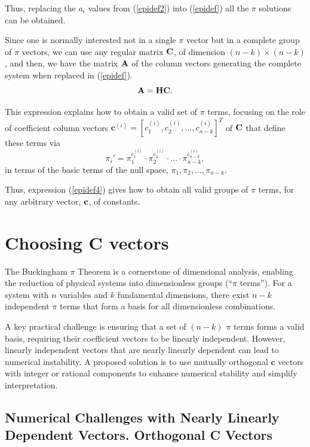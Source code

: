 \documentclass[
	11pt, %
	fleqn, %
	a4paper, %
]{LegrandOrangeBook}
\begin{document}
Thus, replacing the $a_i$ values from (\ref{epidef2}) into (\ref{epidef}) all the $\pi$ solutions can be obtained.

Since one is normally interested not in a single $\pi$ vector but in a complete group of $\pi$ vectors, we can use any regular matrix ${\bf C}$, of dimension $(n-k) \times (n-k)$, and then, we have the matrix ${\bf A}$ of the column vectors generating the complete system when replaced in (\ref{epidef}).
\begin{equation}\label{epidef3}
   {\bf A} =  {\bf H} {\bf C}.
\end{equation}

This expression explains how to obtain a valid set of $\pi$  terms, focusing on the role of coefficient column vectors $\mathbf{c}^{(i)} = [c_1^{(i)}, c_2^{(i)}, \ldots, c_{n-k}^{(i)}]^T$ of ${\bf C}$ that define these terms via
\begin{equation}\label{epidef4}
\boxed{\pi_i' = \pi_1^{c_1^{(i)}} \cdot \pi_2^{c_2^{(i)}} \cdot \ldots \cdot \pi_{n-k}^{c_{n-k}^{(i)}},}
\end{equation}
in terms of the basic terms of the null space, $\pi_1, \pi_2, \ldots, \pi_{n-k}$.

Thus, expression (\ref{epidef4}) gives how to obtain all valid groups of $\pi$ terms, for any arbitrary vector, ${\bf c}$, of constants.


\section[Choosing ${\bf C}$ vectors]{Choosing C vectors}

The Buckingham $\pi$ Theorem is a cornerstone of dimensional analysis, enabling the reduction of physical systems into dimensionless groups (``$\pi$ terms''). For a system with $n$ variables and $k$ fundamental dimensions, there exist $n - k$ independent $\pi$ terms that form a basis for all dimensionless combinations.

A key practical challenge is ensuring that a set of $(n - k)$ $\pi$ terms forms a valid basis, requiring their coefficient vectors to be linearly independent. However, linearly independent vectors that are nearly linearly dependent can lead to numerical instability. A proposed solution is to use mutually orthogonal $\mathbf{c}$ vectors with integer or rational components to enhance numerical stability and simplify interpretation.


\subsection{Numerical Challenges with Nearly Linearly Dependent Vectors. Orthogonal {\bf{C}} Vectors}
\end{document}
